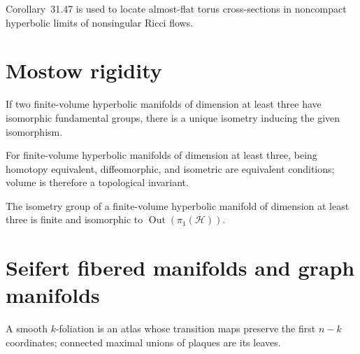 \begin{remark}
\label{rem:chow-iv-small-tori-application}
Corollary~31.47 is used to locate almost-flat torus cross-sections in noncompact
hyperbolic limits of nonsingular Ricci flows.
\end{remark}

\section{Mostow rigidity}

\begin{theorem}
\label{thm:chow-iv-mostow-rigidity}
If two finite-volume hyperbolic manifolds of dimension at least three have
isomorphic fundamental groups, there is a unique isometry inducing the given
isomorphism.
\end{theorem}

\begin{corollary}
\label{cor:chow-iv-mostow-equivalences}
For finite-volume hyperbolic manifolds of dimension at least three, being
homotopy equivalent, diffeomorphic, and isometric are equivalent conditions;
volume is therefore a topological invariant.
\end{corollary}

\begin{corollary}
\label{cor:chow-iv-isometry-group}
The isometry group of a finite-volume hyperbolic manifold of dimension at least
three is finite and isomorphic to \(\operatorname{Out}(\pi_1(\mathcal H))\).
\end{corollary}

\section{Seifert fibered manifolds and graph manifolds}

\begin{definition}[Foliation]
\label{def:chow-iv-foliation}
A smooth \(k\)-foliation is an atlas whose transition maps preserve the first
\(n-k\) coordinates; connected maximal unions of plaques are its leaves.
\end{definition}

